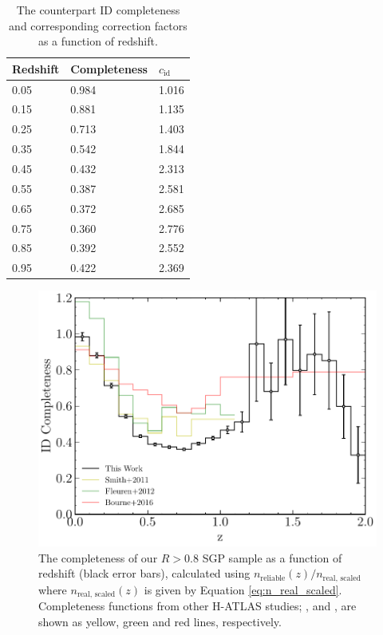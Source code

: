 \begin{table}
    \centering
    \begin{tabular}{p{4.5cm}|p{2.5cm}|p{2.5cm}}
        \hline
        \hline
        Redshift & Completeness & $c_{\textrm{id}}$ \\
        \hline
        \hline
        0.05 & 0.984 & 1.016 \\
        0.15 & 0.881 & 1.135 \\
        0.25 & 0.713 & 1.403 \\
        0.35 & 0.542 & 1.844 \\
        0.45 & 0.432 & 2.313 \\
        0.55 & 0.387 & 2.581 \\
        0.65 & 0.372 & 2.685 \\
        0.75 & 0.360 & 2.776 \\
        0.85 & 0.392 & 2.552 \\
        0.95 & 0.422 & 2.369 \\
        \hline
    \end{tabular}
    \caption[ID completeness as a function of redshift]{The counterpart ID completeness and corresponding correction factors as a function of redshift.}
    \label{tab:id_completeness_table}
\end{table}

\begin{figure}
	\centering
	\includegraphics[width=0.8\columnwidth]{Figures/id_completeness.pdf}
	\caption[Completeness of our reliable SGP sample as a function of redshift]{The completeness of our $R > 0.8$ SGP sample as a function of redshift (black error bars), calculated using $n_{\textrm{reliable}}(z)/n_{\textrm{real, scaled}}$ where $n_{\textrm{real, scaled}}(z)$ is given by Equation \ref{eq:n_real_scaled}. Completeness functions from other H-ATLAS studies; \citealt{Smith_2011}, \citealt{Fleuren_2012} and \citealt{Bourne_2016}, are shown as yellow, green and red lines, respectively.}
	\label{fig:id_completeness}
\end{figure}

